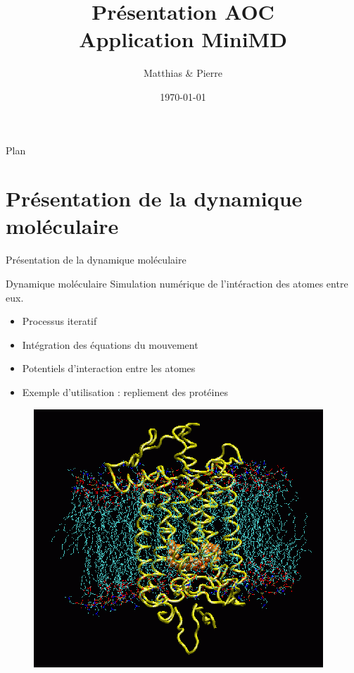 \documentclass[9.5pt]{beamer}
\title[MPNA : MIS]{Présentation AOC \\Application MiniMD}
\author[\bsc{Beaupère} \& \bsc{Granger}]{Matthias \bsc{Beaupère} \& Pierre \bsc{Granger}}
\institute{M2 CHPS}
\date{\today}
\begin{document}

\begin{frame}
  \titlepage
\end{frame}

\begin{frame}{Plan}
	\tableofcontents[hideallsubsections]
\end{frame}

\section{Présentation de la dynamique moléculaire}
	\begin{frame}{Présentation de la dynamique moléculaire}
		\begin{block}{Dynamique moléculaire}
			Simulation numérique de l'intéraction des atomes entre eux.
			\begin{itemize}
				\item Processus iteratif
				\item Intégration des équations du mouvement
				\item Potentiels d'interaction entre les atomes
				\item Exemple d'utilisation : repliement des protéines
			\end{itemize}
		\end{block}

		\begin{figure}
			\includegraphics[width=0.25\linewidth]{images/bs_md.png}
		\end{figure}
	\end{frame}
\end{document}
